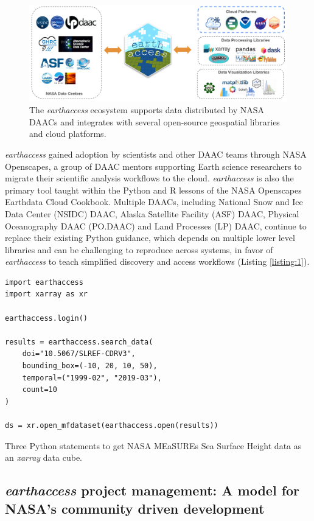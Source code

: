 \documentclass{ROSES-NASA-proposal}
\newcommand{\earthaccess}{\textit{earthaccess}\xspace} %
\begin{document}
\begin{figure}[h]
    \centering
    \includegraphics[width=0.95\linewidth]{images/ecosystem.png}
    \caption{The \earthaccess ecosystem supports data distributed by NASA DAACs and integrates with several open-source geospatial libraries and cloud platforms. }
    \label{fig:earthaccess-ecosystem}
\end{figure}

\earthaccess gained adoption by scientists and other DAAC teams through NASA Openscapes, a group of DAAC mentors supporting Earth science researchers to migrate their scientific analysis workflows to the cloud. \earthaccess is also the primary tool taught within the Python and R lessons of the NASA Openscapes Earthdata Cloud Cookbook. Multiple DAACs, including National Snow and Ice Data Center (NSIDC) DAAC, Alaska Satellite Facility (ASF) DAAC, Physical Oceanography DAAC (PO.DAAC) and Land Processes (LP) DAAC, continue to replace their existing Python guidance, which depends on multiple lower level libraries and can be challenging to reproduce across systems, in favor of \earthaccess to teach simplified discovery and access workflows (Listing \ref{listing:1}).

\begin{listing}[H]
\begin{verbatim}
import earthaccess
import xarray as xr

earthaccess.login()

results = earthaccess.search_data(
    doi="10.5067/SLREF-CDRV3",
    bounding_box=(-10, 20, 10, 50),
    temporal=("1999-02", "2019-03"),
    count=10
)

ds = xr.open_mfdataset(earthaccess.open(results))
\end{verbatim}
\caption{Three Python statements to get NASA MEaSUREs Sea Surface Height data as an \textit{xarray} data cube.}
\label{listing:1}
\end{listing}


\subsection{\earthaccess project management: A model for NASA's community driven development}
\end{document}
